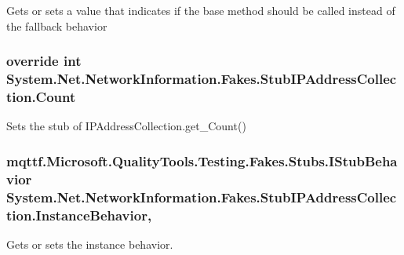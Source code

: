 Gets or sets a value that indicates if the base method should be called instead of the fallback behavior

\hypertarget{class_system_1_1_net_1_1_network_information_1_1_fakes_1_1_stub_i_p_address_collection_a5026d0b04cb9c385b6211e22dd41c524}{
\subsubsection[{Count}]{\setlength{\rightskip}{0pt plus 5cm}override int System.\-Net.\-Network\-Information.\-Fakes.\-Stub\-I\-P\-Address\-Collection.\-Count\hspace{0.3cm}{\ttfamily [get]}}}\label{class_system_1_1_net_1_1_network_information_1_1_fakes_1_1_stub_i_p_address_collection_a5026d0b04cb9c385b6211e22dd41c524}


Sets the stub of I\-P\-Address\-Collection.\-get\-\_\-\-Count()

\hypertarget{class_system_1_1_net_1_1_network_information_1_1_fakes_1_1_stub_i_p_address_collection_a228d1822b7c7ef42a86b6fc132095f01}{
\subsubsection[{Instance\-Behavior}]{\setlength{\rightskip}{0pt plus 5cm}mqttf.\-Microsoft.\-Quality\-Tools.\-Testing.\-Fakes.\-Stubs.\-I\-Stub\-Behavior System.\-Net.\-Network\-Information.\-Fakes.\-Stub\-I\-P\-Address\-Collection.\-Instance\-Behavior\hspace{0.3cm}{\ttfamily [get]}, {\ttfamily [set]}}}\label{class_system_1_1_net_1_1_network_information_1_1_fakes_1_1_stub_i_p_address_collection_a228d1822b7c7ef42a86b6fc132095f01}


Gets or sets the instance behavior.

